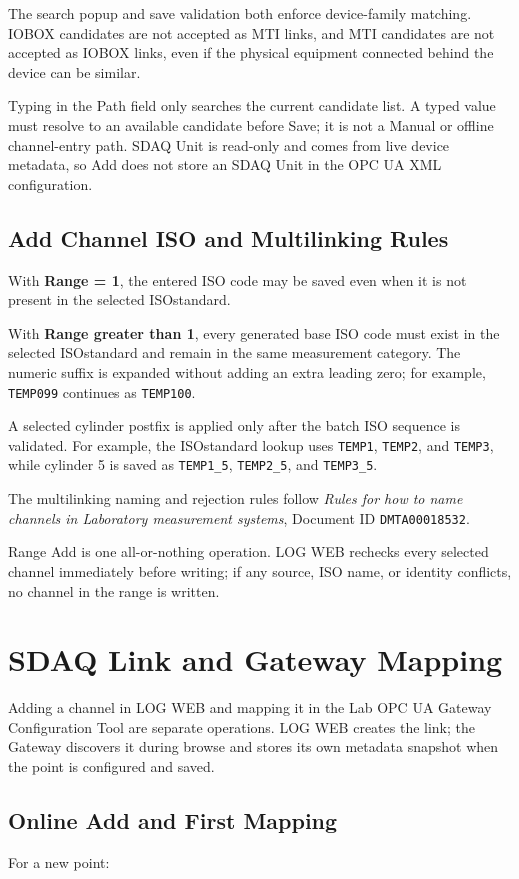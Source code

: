 \documentclass[11pt,a4paper]{article}
\begin{document}
The search popup and save validation both enforce device-family matching. IOBOX candidates are not accepted as MTI links, and MTI candidates are not accepted as IOBOX links, even if the physical equipment connected behind the device can be similar.

Typing in the Path field only searches the current candidate list. A typed value must resolve to an available candidate before Save; it is not a Manual or offline channel-entry path. SDAQ Unit is read-only and comes from live device metadata, so Add does not store an SDAQ Unit in the OPC UA XML configuration.

\subsection{Add Channel ISO and Multilinking Rules}
With \textbf{Range = 1}, the entered ISO code may be saved even when it is not present in the selected ISOstandard.

With \textbf{Range greater than 1}, every generated base ISO code must exist in the selected ISOstandard and remain in the same measurement category. The numeric suffix is expanded without adding an extra leading zero; for example, \texttt{TEMP099} continues as \texttt{TEMP100}.

A selected cylinder postfix is applied only after the batch ISO sequence is validated. For example, the ISOstandard lookup uses \texttt{TEMP1}, \texttt{TEMP2}, and \texttt{TEMP3}, while cylinder 5 is saved as \texttt{TEMP1\_5}, \texttt{TEMP2\_5}, and \texttt{TEMP3\_5}.

The multilinking naming and rejection rules follow \emph{Rules for how to name channels in Laboratory measurement systems}, Document ID \texttt{DMTA00018532}.

Range Add is one all-or-nothing operation. LOG WEB rechecks every selected channel immediately before writing; if any source, ISO name, or identity conflicts, no channel in the range is written.

\section{SDAQ Link and Gateway Mapping}
Adding a channel in LOG WEB and mapping it in the Lab OPC UA Gateway Configuration Tool are separate operations. LOG WEB creates the link; the Gateway discovers it during browse and stores its own metadata snapshot when the point is configured and saved.

\subsection{Online Add and First Mapping}
For a new point:
\end{document}
